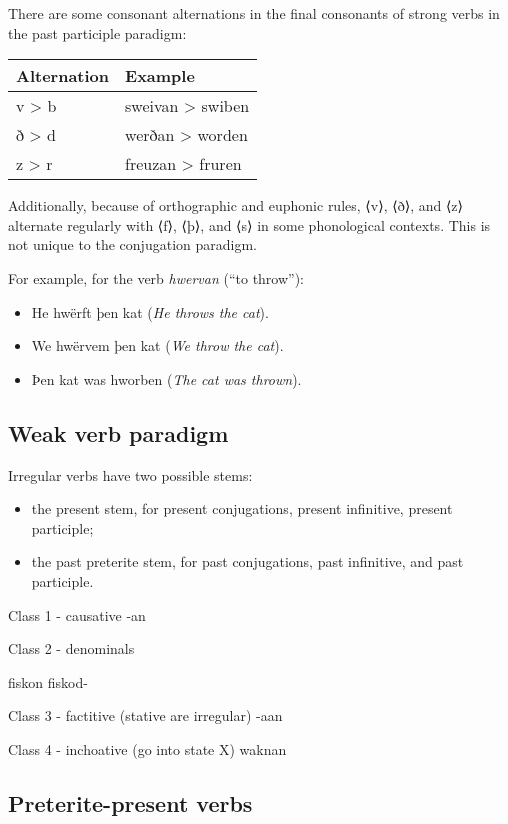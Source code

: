 There are some consonant alternations in the final consonants of strong verbs in the past participle paradigm:

\begin{center}
\begin{tabular}{ll}
Alternation & Example \\
\hline
v > b & sweivan > swiben \\
ð > d & werðan > worden \\
z > r & freuzan > fruren \\
\end{tabular}
\end{center}

Additionally, because of orthographic and euphonic rules, ⟨v⟩, ⟨ð⟩, and ⟨z⟩ alternate regularly with ⟨f⟩, ⟨þ⟩, and ⟨s⟩ in some phonological contexts. This is not unique to the conjugation paradigm.

For example, for the verb \textit{hwervan} (``to throw''):

\begin{itemize}
\item He hwërft þen kat (\textit{He throws the cat}).
\item We hwërvem þen kat (\textit{We throw the cat}).
\item Þen kat was hworben (\textit{The cat was thrown}).
\end{itemize}

\subsection{Weak verb paradigm}

Irregular verbs have two possible stems:

\begin{itemize}
\item the present stem, for present conjugations, present infinitive, present participle;
\item the past preterite stem, for past conjugations, past infinitive, and past participle.
\end{itemize}

Class 1 - causative
-an

Class 2 - denominals

fiskon fiskod-

Class 3 - factitive (stative are irregular)
-aan

Class 4 - inchoative (go into state X)
waknan

\subsection{Preterite-present verbs}

